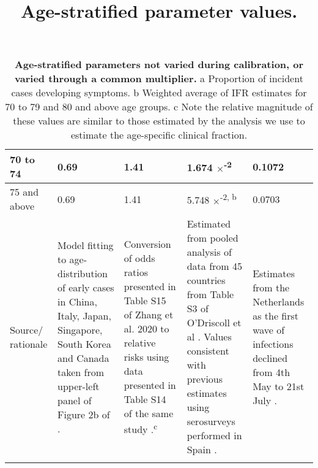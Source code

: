 \begin{table}[ht]
\begin{tabular}[ht]{| p{2cm} | p{2.5cm} | p{3cm} | p{3cm} | p{2.5cm}|}
        \hline
        70 to 74 & 0.69 & 1.41 & 1.674 $\times$\textsuperscript{-2} & 0.1072 \\
        \hline
        75 and above & 0.69 & 1.41 & 5.748 $\times$\textsuperscript{-2, b} & 0.0703 \\
        \hline
        Source/ rationale & 
        Model fitting to age-distribution of early cases in China, Italy, Japan, Singapore, South Korea and Canada taken from upper-left panel of Figure 2b of \cite{RN33}. & 
        Conversion of odds ratios presented in Table S15 of Zhang et al. 2020 to relative risks using data presented in Table S14 of the same study \cite{RN7}.\textsuperscript{c} &
        Estimated from pooled analysis of data from 45 countries from Table S3 of O'Driscoll et al \cite{RN6}. Values consistent with previous estimates using serosurveys performed in Spain \cite{RN21}. &
        Estimates from the Netherlands as the first wave of infections declined from 4th May to 21st July \cite{RN9}.\\
        \hline
	\title{Age-stratified parameter values.}
	\caption{\textbf{Age-stratified parameters not varied during calibration, or varied through a common multiplier.} a Proportion of incident cases developing symptoms. b Weighted average of IFR estimates for 70 to 79 and 80 and above age groups. c Note the relative magnitude of these values are similar to those estimated by the analysis we use to estimate the age-specific clinical fraction.}
    \end{tabular}
    \label{age_params}
\end{table}

\clearpage
